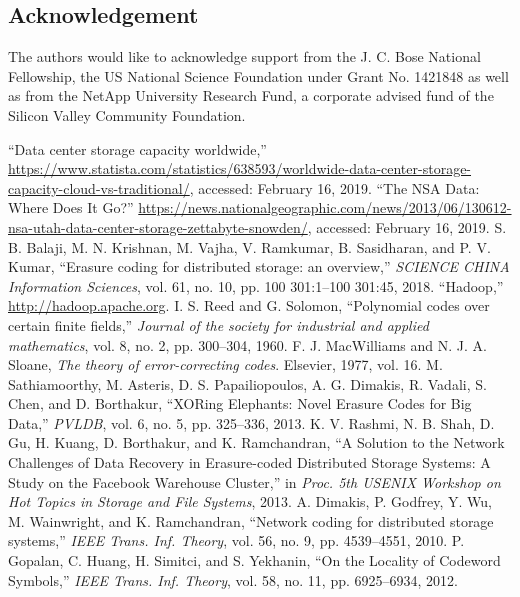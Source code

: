 \begin{multicols}{2}
\section{Acknowledgement}
The authors would like to acknowledge support from the J. C. Bose National Fellowship, the US National Science
Foundation under Grant No. 1421848 as well as from the NetApp University Research Fund, a corporate advised fund of the Silicon Valley Community Foundation.

\begin{thebibliography}{99}
 ``Data center storage capacity worldwide,'' \url{https://www.statista.com/statistics/638593/worldwide-data-center-storage-capacity-cloud-vs-traditional/}, accessed: February 16, 2019. 
 ``The NSA Data: Where Does It Go?'' \url{https://news.nationalgeographic.com/news/2013/06/130612-nsa-utah-data-center-storage-zettabyte-snowden/}, accessed: February 16, 2019.
 S. B. Balaji, M. N. Krishnan, M. Vajha, V. Ramkumar, B. Sasidharan, and P. V. Kumar, ``Erasure coding for distributed storage: an overview,'' \textit{SCIENCE CHINA Information Sciences}, vol. 61, no. 10, pp. 100 301:1--100 301:45, 2018.
 ``Hadoop,'' \url{http://hadoop.apache.org}.
 I. S. Reed and G. Solomon, ``Polynomial codes over certain finite fields,'' \textit{Journal of the society for industrial and applied mathematics}, vol. 8, no. 2, pp. 300--304, 1960.
 F. J. MacWilliams and N. J. A. Sloane, \textit{The theory of error-correcting codes}. Elsevier, 1977, vol. 16.
 M. Sathiamoorthy, M. Asteris, D. S. Papailiopoulos, A. G. Dimakis, R. Vadali, S. Chen, and D. Borthakur, ``XORing Elephants: Novel Erasure Codes for Big Data,'' \textit{PVLDB}, vol. 6, no. 5, pp. 325--336, 2013.
 K. V. Rashmi, N. B. Shah, D. Gu, H. Kuang, D. Borthakur, and K. Ramchandran, ``A Solution to the Network Challenges of Data Recovery in Erasure-coded Distributed Storage Systems: A Study on the Facebook Warehouse Cluster,'' in \textit{Proc. 5th USENIX Workshop on Hot Topics in Storage and File Systems}, 2013.
 A. Dimakis, P. Godfrey, Y. Wu, M. Wainwright, and K. Ramchandran, ``Network coding for distributed storage systems,'' \textit{IEEE Trans. Inf. Theory}, vol. 56, no. 9, pp. 4539--4551, 2010.
 P. Gopalan, C. Huang, H. Simitci, and S. Yekhanin, ``On the Locality of Codeword Symbols,''  \textit{IEEE Trans. Inf. Theory}, vol. 58, no. 11, pp. 6925--6934, 2012.

\end{thebibliography}
\end{multicols}
